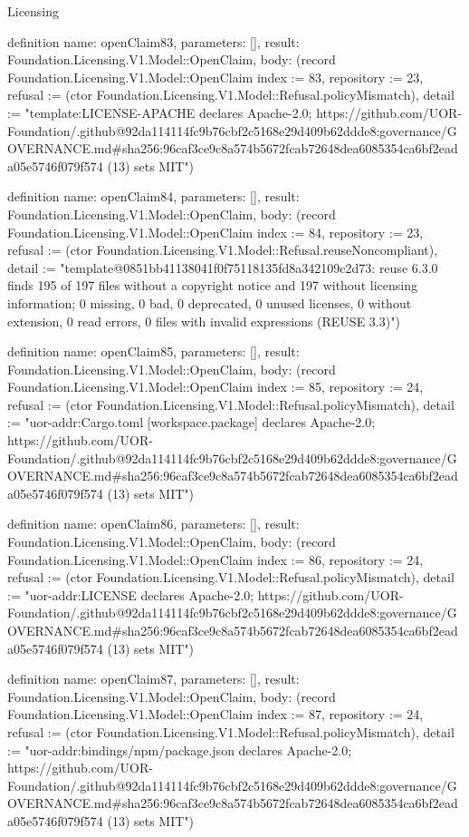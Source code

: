 \begin{lexlean}{Licensing}
\begin{semanticmodule}
definition{
  name: openClaim83,
  parameters: [],
  result: Foundation.Licensing.V1.Model::OpenClaim,
  body: (record Foundation.Licensing.V1.Model::OpenClaim {index := 83, repository := 23, refusal := (ctor Foundation.Licensing.V1.Model::Refusal.policyMismatch), detail := "template:LICENSE-APACHE declares Apache-2.0; https://github.com/UOR-Foundation/.github@92da114114fc9b76cbf2c5168e29d409b62ddde8:governance/GOVERNANCE.md#sha256:96caf3ce9c8a574b5672fcab72648dea6085354ca6bf2eada05e5746f079f574 (13) sets MIT"})
}

definition{
  name: openClaim84,
  parameters: [],
  result: Foundation.Licensing.V1.Model::OpenClaim,
  body: (record Foundation.Licensing.V1.Model::OpenClaim {index := 84, repository := 23, refusal := (ctor Foundation.Licensing.V1.Model::Refusal.reuseNoncompliant), detail := "template@0851bb41138041f0f75118135fd8a342109c2d73: reuse 6.3.0 finds 195 of 197 files without a copyright notice and 197 without licensing information; 0 missing, 0 bad, 0 deprecated, 0 unused licenses, 0 without extension, 0 read errors, 0 files with invalid expressions (REUSE 3.3)"})
}

definition{
  name: openClaim85,
  parameters: [],
  result: Foundation.Licensing.V1.Model::OpenClaim,
  body: (record Foundation.Licensing.V1.Model::OpenClaim {index := 85, repository := 24, refusal := (ctor Foundation.Licensing.V1.Model::Refusal.policyMismatch), detail := "uor-addr:Cargo.toml [workspace.package] declares Apache-2.0; https://github.com/UOR-Foundation/.github@92da114114fc9b76cbf2c5168e29d409b62ddde8:governance/GOVERNANCE.md#sha256:96caf3ce9c8a574b5672fcab72648dea6085354ca6bf2eada05e5746f079f574 (13) sets MIT"})
}

definition{
  name: openClaim86,
  parameters: [],
  result: Foundation.Licensing.V1.Model::OpenClaim,
  body: (record Foundation.Licensing.V1.Model::OpenClaim {index := 86, repository := 24, refusal := (ctor Foundation.Licensing.V1.Model::Refusal.policyMismatch), detail := "uor-addr:LICENSE declares Apache-2.0; https://github.com/UOR-Foundation/.github@92da114114fc9b76cbf2c5168e29d409b62ddde8:governance/GOVERNANCE.md#sha256:96caf3ce9c8a574b5672fcab72648dea6085354ca6bf2eada05e5746f079f574 (13) sets MIT"})
}

definition{
  name: openClaim87,
  parameters: [],
  result: Foundation.Licensing.V1.Model::OpenClaim,
  body: (record Foundation.Licensing.V1.Model::OpenClaim {index := 87, repository := 24, refusal := (ctor Foundation.Licensing.V1.Model::Refusal.policyMismatch), detail := "uor-addr:bindings/npm/package.json declares Apache-2.0; https://github.com/UOR-Foundation/.github@92da114114fc9b76cbf2c5168e29d409b62ddde8:governance/GOVERNANCE.md#sha256:96caf3ce9c8a574b5672fcab72648dea6085354ca6bf2eada05e5746f079f574 (13) sets MIT"})
}


\end{semanticmodule}
\end{lexlean}
